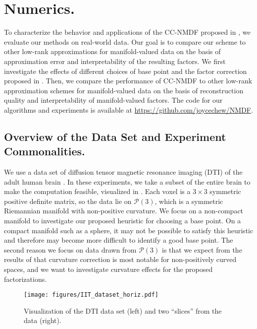 \section{Numerics.}
\label{sec:numerics}
To characterize the behavior and applications of the CC-NMDF proposed in , we evaluate our methods on real-world data. Our goal is to compare our scheme to other low-rank approximations for manifold-valued data on the basis of approximation error and interpretability of the resulting factors. We first investigate the effects of different choices of base point and the factor correction proposed in . Then, we compare the performance of CC-NMDF to other low-rank approximation schemes for manifold-valued data on the basis of reconstruction quality and interpretability of manifold-valued factors. The code for our algorithms and experiments is available at \url{https://github.com/joycechew/NMDF}.

\subsection{Overview of the Data Set and Experiment Commonalities.} We use a data set of diffusion tensor magnetic resonance imaging (DTI) of the adult human brain \citep{zhang2018evaluation,qi2021regionconnect}. In these experiments, we take a subset of the entire brain to make the computation feasible, visualized in . Each voxel is a $3 \times 3$ symmetric positive definite matrix, so the data lie on $\mathcal{P}(3)$, which is a symmetric Riemannian manifold with non-positive curvature. We focus on a non-compact manifold to investigate our proposed heuristic for choosing a base point. On a compact manifold such as a sphere, it may not be possible to satisfy this heuristic and therefore may become more difficult to identify a good base point. The second reason we focus on data drawn from $\mathcal{P}(3)$ is that we expect from the results of \cite{diepeveen2023curvature} that curvature correction is most notable for non-positively curved spaces, and we want to investigate curvature effects for the proposed factorizations. 

\begin{figure}[t!]
    \centering
    \texttt{[image: figures/IIT\_dataset\_horiz.pdf]}
    \caption{Visualization of the DTI data set (left) and two ``slices'' from the data (right).}
    \label{fig:IIT_dataset}
\end{figure}

